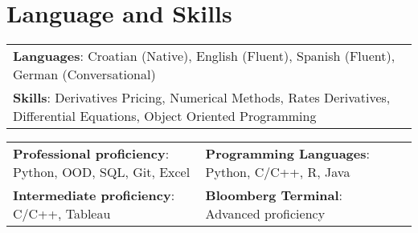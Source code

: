 \documentclass[letterpaper,10pt]{article}
\begin{document}
%
\section{Language and Skills}
\begin{center}
\begin{tabularx}{0.96\textwidth} { 
  >{\raggedright\arraybackslash}X
}
  \small{\textbf{Languages}: Croatian (Native), English (Fluent), Spanish (Fluent), German (Conversational)}\\
  \small{\textbf{Skills}: Derivatives Pricing, Numerical Methods, Rates Derivatives, Differential Equations, Object Oriented Programming}
\end{tabularx}
\end{center}

\begin{center}
\begin{tabularx}{0.96\textwidth} { 
  >{\raggedright\arraybackslash}X 
   >{\raggedright\arraybackslash}X 
   >{\raggedright\arraybackslash}X 
   >{\raggedright\arraybackslash}X
}
\small{\textbf{Professional proficiency}: Python, OOD, SQL, Git, Excel} & \small{\hspace{3pt}\textbf{Programming Languages}: Python, C/C++, R, Java} \\
\small{\textbf{Intermediate proficiency}: C/C++, Tableau} & \small{\hspace{3pt}\textbf{Bloomberg Terminal}: Advanced proficiency} \\
\end{tabularx}
\end{center}


\end{document}
